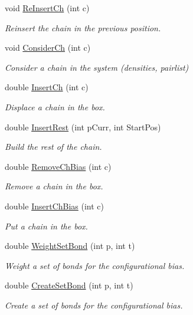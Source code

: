 \begin{DoxyCompactItemize}
void \hyperlink{classForces_aaea07c5c698924ba7efc75988997086c}{Re\+Insert\+Ch} (int c)
\begin{DoxyCompactList}\small\item\em Reinsert the chain in the previous position. \end{DoxyCompactList}\item 
void \hyperlink{classForces_a1c4bc6d5b46ce58c1e6139e9feccea5a}{Consider\+Ch} (int c)
\begin{DoxyCompactList}\small\item\em Consider a chain in the system (densities, pairlist) \end{DoxyCompactList}\item 
double \hyperlink{classForces_aed7689c1abd36c6ac8743fadd2e6cbdf}{Insert\+Ch} (int c)
\begin{DoxyCompactList}\small\item\em Displace a chain in the box. \end{DoxyCompactList}\item 
double \hyperlink{classForces_a8e9fda810a12eeaba2c7b72af5a1e664}{Insert\+Rest} (int p\+Curr, int Start\+Pos)
\begin{DoxyCompactList}\small\item\em Build the rest of the chain. \end{DoxyCompactList}\item 
double \hyperlink{classForces_aae7e57b54965ad985ab041a040dfc93d}{Remove\+Ch\+Bias} (int c)
\begin{DoxyCompactList}\small\item\em Remove a chain in the box. \end{DoxyCompactList}\item 
double \hyperlink{classForces_a766511ed1b66a8b4ef97b1b343fb6254}{Insert\+Ch\+Bias} (int c)
\begin{DoxyCompactList}\small\item\em Put a chain in the box. \end{DoxyCompactList}\item 
double \hyperlink{classForces_a97d31164f5b192ff0e68d26f120e9e78}{Weight\+Set\+Bond} (int p, int t)
\begin{DoxyCompactList}\small\item\em Weight a set of bonds for the configurational bias. \end{DoxyCompactList}\item 
double \hyperlink{classForces_ac80c2d5ad9a6b3f4de84f825844d1a36}{Create\+Set\+Bond} (int p, int t)
\begin{DoxyCompactList}\small\item\em Create a set of bonds for the configurational bias. \end{DoxyCompactList}\item 

\end{DoxyCompactItemize}
